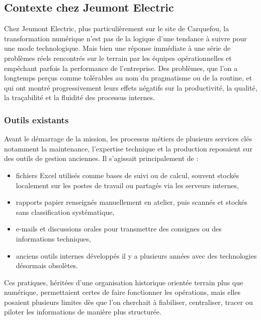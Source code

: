 \documentclass[11pt,a4paper]{article}
\begin{document}
\subsection{Contexte chez Jeumont Electric}

Chez Jeumont Electric, plus particulièrement sur le site de Carquefou, la transformation numérique n’est pas de la logique d’une tendance à suivre pour une mode technologique. Mais bien une réponse immédiate à une série de problèmes réels rencontrés sur le terrain par les équipes opérationnelles et empêchant parfois la performance de l’entreprise. Des problèmes, que l’on a longtemps perçus comme tolérables au nom du pragmatisme ou de la routine, et qui ont montré progressivement leurs effets négatifs sur la productivité, la qualité, la traçabilité et la fluidité des processus internes.

\subsubsection{Outils existants}

Avant le démarrage de la mission, les processus métiers de plusieurs services clés notamment la maintenance, l’expertise technique et la production reposaient sur des outils de gestion anciennes. Il s’agissait principalement de :

\begin{itemize}
    \item fichiers Excel utilisés comme bases de suivi ou de calcul, souvent stockés localement sur les postes de travail ou partagés via les serveurs internes,
    \item rapports papier renseignés manuellement en atelier, puis scannés et stockés sans classification systématique,
    \item e-mails et discussions orales pour transmettre des consignes ou des informations techniques,
    \item anciens outils internes développés il y a plusieurs années avec des technologies désormais obsolètes.
\end{itemize}

Ces pratiques, héritées d’une organisation historique orientée terrain plus que numérique, permettaient certes de faire fonctionner les opérations, mais elles posaient plusieurs limites dès que l’on cherchait à fiabiliser, centraliser, tracer ou piloter les informations de manière plus structurée.
\end{document}
